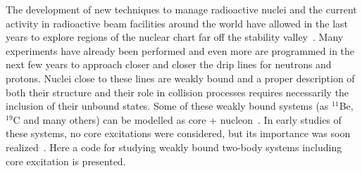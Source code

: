 \documentclass[preprint,12pt]{elsarticle}
\begin{document}
The development of new techniques to manage radioactive nuclei and the
current activity in radioactive beam facilities around the world have allowed in
the last years to explore regions of the nuclear chart far off the
stability valley~\cite{Nupecc10,Blum13}. Many experiments have already been performed and even
more are
programmed in the next few years to approach closer and closer the drip lines
for neutrons and protons. Nuclei close to these lines are
weakly bound and a proper description of both their structure and their role
in collision processes requires necessarily the inclusion of their unbound
states. Some of these weakly bound systems (as $^{11}$Be, $^{19}$C and many
others) can be modelled as core + nucleon~\cite{Nunes96,Ridi98}. In early studies of
these systems, no core excitations were considered, but its importance
was soon realized~\cite{Nun96}. Here a code for studying weakly bound two-body
systems including core excitation is presented.
\end{document}
